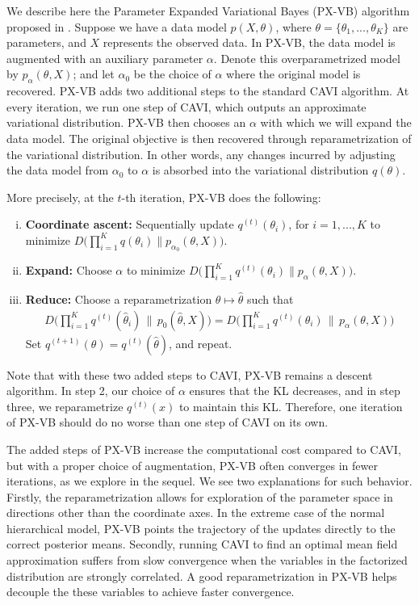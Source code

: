 \documentclass{article}
\begin{document}
We describe here the Parameter Expanded Variational Bayes (PX-VB) algorithm proposed in \cite{Qi}. Suppose we have a data model $p(X,\theta)$, where $\theta =  \{\theta_1, ... , \theta_K\}$ are parameters, and $X$ represents the observed data. In PX-VB, the data model is augmented with an auxiliary parameter $\alpha$. Denote this overparametrized model by $p_\alpha(\theta, X)$; and let $\alpha_0$ be the choice of $\alpha$ where the original model is recovered. PX-VB adds two additional steps to the standard CAVI algorithm. At every iteration, we run one step of CAVI, which outputs an approximate variational distribution. PX-VB then chooses an $\alpha$ with which we will expand the data model. The original objective is then recovered through reparametrization of the variational distribution. In other words, any changes incurred by adjusting the data model from $\alpha_0$ to $\alpha$ is absorbed into the variational distribution $q(\theta)$. 



More precisely, at the $t$-th iteration, PX-VB does the following: 
\begin{enumerate}[(i)]
\item {\bf Coordinate ascent:} Sequentially update $q^{(t)}(\theta_i)$, for $i=1,..., K$ to minimize $D\big( \prod_{i=1}^K q(\theta_i) \| p_{\alpha_0}(\theta, X) \big)$. 
\item {\bf Expand:} Choose $\alpha$ to minimize $D\big( \prod_{i=1}^K q^{(t)}(\theta_i) \| p_\alpha(\theta, X) \big)$.
\item {\bf Reduce:} Choose a reparametrization $\theta \mapsto \hat\theta$ such that
\begin{align*}
D\Big( \prod_{i=1}^K q^{(t)}(\hat\theta_i) \,\big\|\, p_{0}(\hat\theta, X) \Big) = D\Big( \prod_{i=1}^K q^{(t)}(\theta_i) \,\big\|\, p_\alpha(\theta, X) \Big)
\end{align*}
Set $q^{(t+1)}(\theta) = q^{(t)}(\hat\theta)$, and repeat. 
\end{enumerate}


Note that with these two added steps to CAVI, PX-VB remains a descent algorithm. In step 2, our choice of $\alpha$ ensures that the KL decreases, and in step three, we reparametrize $q^{(t)}(x)$ to maintain this KL. Therefore, one iteration of PX-VB should do no worse than one step of CAVI on its own. 

The added steps of PX-VB increase the computational cost compared to CAVI, but with a proper choice of augmentation,  PX-VB often converges in fewer iterations, as we explore in the sequel. We see two explanations for such behavior. Firstly, the reparametrization allows for exploration of the parameter space in directions other than the coordinate axes. In the extreme case of the normal hierarchical model, PX-VB points the trajectory of the updates directly to the correct posterior means. Secondly, running CAVI to find an optimal mean field approximation suffers from slow convergence when the variables in the factorized distribution are strongly correlated. A good reparametrization in PX-VB helps decouple the these variables to achieve faster convergence. 
\end{document}
